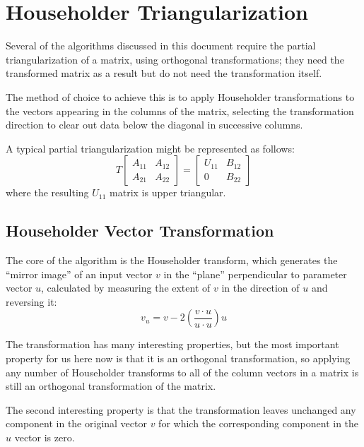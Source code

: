 \section{Householder Triangularization}

Several of the algorithms discussed in this document
require the partial triangularization of a matrix,
using orthogonal transformations;
they need the transformed matrix as a result
but do not need the transformation itself.

The method of choice to achieve this
is to apply Householder transformations
to the vectors appearing in the columns of the matrix,
selecting the transformation direction to
clear out data below the diagonal
in successive columns.

A typical partial triangularization might be
represented as follows:
\begin{equation}
T
\begin{bmatrix}
    A_{11} & A_{12}
\\  A_{21} & A_{22}
\end{bmatrix}
=
\begin{bmatrix}
    U_{11} & B_{12}
\\  0      & B_{22}
\end{bmatrix}
\label{householdertrim}
\end{equation}
where the resulting $U_{11}$ matrix
is upper triangular.

\subsection{Householder Vector Transformation}

The core of the algorithm is the Householder transform,
which generates the ``mirror image'' of an input vector $v$
in the ``plane'' perpendicular to parameter vector $u$,
calculated by measuring the extent of $v$
in the direction of $u$
and reversing it:
\begin{equation}
  v_u = v - 2 \left(\frac{v \cdot u}{u \cdot u}\right) u
\label{householderv}
\end{equation}

The transformation has many interesting properties,
but the most important property for us here now is
that it is an orthogonal transformation, so applying
any number of Householder transforms to all of the
column vectors in a matrix is still an orthogonal
transformation of the matrix.

The second interesting property is that the transformation
leaves unchanged any component in the original vector $v$
for which the corresponding component in the $u$ vector
is zero.

